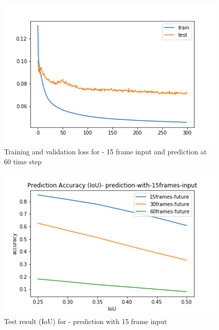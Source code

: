 \begin{figure}[H] \label{15-60}
\includegraphics[scale=0.8]{conf9_300e_60ffuture}
\begin{center}
\caption{Training and validation loss for - 15 frame input and prediction at 60 time step }
\end{center}
\end{figure}

\begin{figure}[H] \label{15-IoU}
\includegraphics[scale=0.8]{prediction-with-15frames-input_IoU}
\begin{center}
\caption{Test result (IoU) for - prediction with 15 frame input}
\end{center}
\end{figure}


